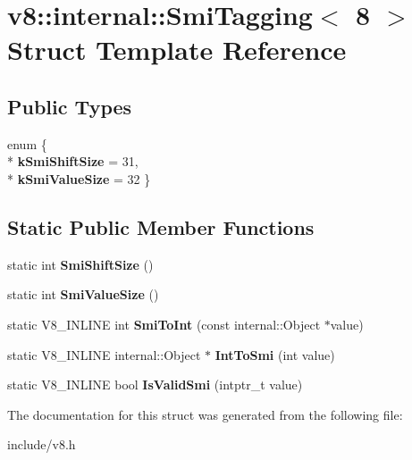 \hypertarget{structv8_1_1internal_1_1_smi_tagging_3_018_01_4}{}\section{v8\+:\+:internal\+:\+:Smi\+Tagging$<$ 8 $>$ Struct Template Reference}
\label{structv8_1_1internal_1_1_smi_tagging_3_018_01_4}
\subsection*{Public Types}
\begin{DoxyCompactItemize}
\item 
enum \{ \\*
{\bfseries k\+Smi\+Shift\+Size} = 31, 
\\*
{\bfseries k\+Smi\+Value\+Size} = 32
 \}\hypertarget{structv8_1_1internal_1_1_smi_tagging_3_018_01_4_aca1e57809e36a53b790ee0480324fb7b}{}\label{structv8_1_1internal_1_1_smi_tagging_3_018_01_4_aca1e57809e36a53b790ee0480324fb7b}

\end{DoxyCompactItemize}
\subsection*{Static Public Member Functions}
\begin{DoxyCompactItemize}
\item 
static int {\bfseries Smi\+Shift\+Size} ()\hypertarget{structv8_1_1internal_1_1_smi_tagging_3_018_01_4_a4fb28f586fdee8316a03f9b8f94b945d}{}\label{structv8_1_1internal_1_1_smi_tagging_3_018_01_4_a4fb28f586fdee8316a03f9b8f94b945d}

\item 
static int {\bfseries Smi\+Value\+Size} ()\hypertarget{structv8_1_1internal_1_1_smi_tagging_3_018_01_4_a836e783af92beb7ca9cc8cdabef43ab2}{}\label{structv8_1_1internal_1_1_smi_tagging_3_018_01_4_a836e783af92beb7ca9cc8cdabef43ab2}

\item 
static V8\+\_\+\+I\+N\+L\+I\+NE int {\bfseries Smi\+To\+Int} (const internal\+::\+Object $\ast$value)\hypertarget{structv8_1_1internal_1_1_smi_tagging_3_018_01_4_a040db1ceee3195c2463075b7b50cfda0}{}\label{structv8_1_1internal_1_1_smi_tagging_3_018_01_4_a040db1ceee3195c2463075b7b50cfda0}

\item 
static V8\+\_\+\+I\+N\+L\+I\+NE internal\+::\+Object $\ast$ {\bfseries Int\+To\+Smi} (int value)\hypertarget{structv8_1_1internal_1_1_smi_tagging_3_018_01_4_a1926f38e35fc98fe244e8136180d70f2}{}\label{structv8_1_1internal_1_1_smi_tagging_3_018_01_4_a1926f38e35fc98fe244e8136180d70f2}

\item 
static V8\+\_\+\+I\+N\+L\+I\+NE bool {\bfseries Is\+Valid\+Smi} (intptr\+\_\+t value)\hypertarget{structv8_1_1internal_1_1_smi_tagging_3_018_01_4_a5ab93d4cf7c3b9ceff5116b3598a1f94}{}\label{structv8_1_1internal_1_1_smi_tagging_3_018_01_4_a5ab93d4cf7c3b9ceff5116b3598a1f94}

\end{DoxyCompactItemize}


The documentation for this struct was generated from the following file\+:\begin{DoxyCompactItemize}
\item 
include/v8.\+h\end{DoxyCompactItemize}

